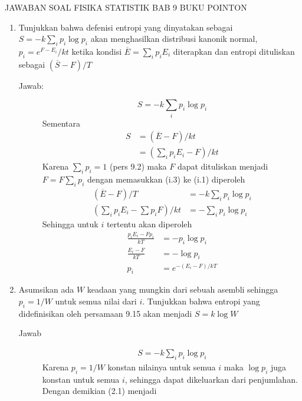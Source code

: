 \documentclass[a4paper , 12 pt]{article}
\begin{document}
\centering
JAWABAN SOAL FISIKA  STATISTIK BAB 9 BUKU POINTON 

\begin{enumerate}
	\item Tunjukkan bahwa defenisi entropi yang dinyatakan sebagai $S = -k \displaystyle \sum_i p_i \log p_i$  akan menghasilkan distribusi kanonik normal, $p_i = e^{F - E_i}/kt$ ketika kondisi $\overline{E} = \displaystyle \sum_i p_i E_i$ diterapkan  dan entropi dituliskan sebagai \newline  $(\overline{S} - F)/T$
		\begin{description}
			\item[Jawab:] 
			\[
				S = -k \sum_i p_i \log p_i \tag{i.1}
			\]
			Sementara
			\begin{align}
				S& = (\overline{E} -F )/kt  \tag{i.2}\\ 
				& = (\sum_i p_i E_i  - F)/kt \tag{i.3}
			\end{align} 
			Karena $\displaystyle \sum_i p_i = 1 $ (pers 9.2) maka $F$ dapat dituliskan menjadi $F =  \displaystyle F \sum_i p_i$
			dengan memasukkan (i.3) ke (i.1) diperoleh 
			\begin{align}
				(\overline{E} - F)/T & = -k \sum_i p_i \log p_i \nonumber \\
				(\sum_i p_i E_i - \sum p_i F)/kt & = - \sum_i p_i \log p_i  \tag{i.4}
			\end{align}
			Sehingga untuk $i$ tertentu akan diperoleh
			\begin{align}
				\frac{p_i E_i - F p_i}{kT} & = - p_i \log p_i  \nonumber \\
				\frac{E_i - F}{kT} & = -\log p_i \nonumber\\
				p_i & = e^{-({E_i - F})/kT} \tag{QED}
			\end{align}
		\end{description}
	\item Asumsikan ada $W$ keadaan yang mungkin dari sebuah asembli sehingga $p_i = 1/W$ untuk semua nilai dari $i$. Tunjukkan bahwa entropi yang didefinisikan oleh persamaan 9.15 akan menjadi $S = k \log W$
		\begin{description}
			\item[Jawab]
			  \begin{align}
			  	S = - k \sum_i p_i \log p_i \tag{ii.1}
			  \end{align}
			  Karena  $p_i = 1/W$ konstan nilainya untuk semua $i$ maka $\log p_i$ juga konstan untuk semua $i$, sehingga dapat dikeluarkan dari penjumlahan.  Dengan demikian (2.1) menjadi

\end{description}
\end{enumerate}
\end{document}
